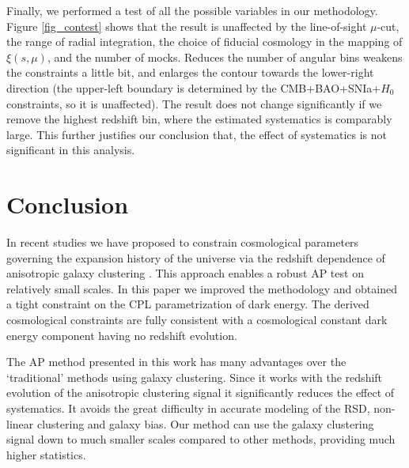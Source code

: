 \documentclass[iop]{emulateapj}
\begin{document}
Finally, we performed a test of all the possible variables in our methodology.
Figure \ref{fig_contest} shows that 
the result is unaffected by the line-of-sight $\mu$-cut, 
the range of radial integration, 
the choice of fiducial cosmology in the mapping of $\xi(s,\mu)$,
and the number of mocks.
Reduces the number of angular bins weakens the constraints a little bit,
and enlarges the contour towards the lower-right direction 
(the upper-left boundary is determined by the CMB+BAO+SNIa+$H_0$ constraints, so it is unaffected).
The result does not change significantly if we remove the highest redshift bin,
where the estimated systematics is comparably large.
This further justifies our conclusion that, the effect of systematics is not significant in this analysis.


\section{Conclusion}

In recent studies we have proposed to constrain cosmological parameters 
governing the expansion history of the universe via 
the redshift dependence of anisotropic galaxy clustering \citep{Li2016}.
This approach enables a robust AP test on relatively small scales.
In this paper we improved the methodology and obtained a tight constraint 
on the CPL parametrization of dark energy.
The derived cosmological constraints are fully consistent with a cosmological constant 
dark energy component having no redshift evolution.


The AP method presented in this work has many advantages over the 
`traditional' methods using galaxy clustering.
Since it works with the redshift evolution of the anisotropic clustering signal it significantly reduces the effect of systematics. 
It avoids the great difficulty in accurate modeling of the RSD, non-linear clustering and galaxy bias.
Our method can use the galaxy clustering signal down to
much smaller scales compared to other methods,
providing much higher statistics.
\end{document}
